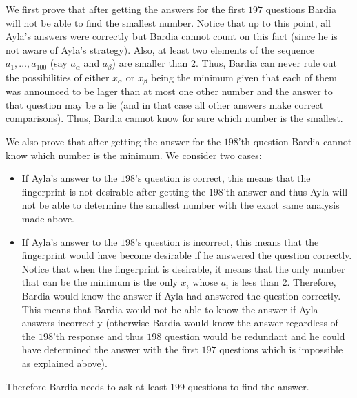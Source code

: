 \begin{solution}
We first prove that after getting the answers for the first $197$ questions Bardia will not be able to find the smallest number. Notice that up to this point, all Ayla's answers were correctly but Bardia cannot count on this fact (since he is not aware of Ayla's strategy). Also, at least two elements of the sequence $a_1, \ldots, a_{100}$ (say $a_{\alpha}$ and $a_{\beta}$) are smaller than $2$. Thus, Bardia can never rule out the possibilities of either $x_{\alpha}$ or $x_{\beta}$ being the minimum given that each of them was announced to be lager than at most one other number and the answer to that question may be a lie (and in that case all other answers make correct comparisons). Thus, Bardia cannot know for sure which number is the smallest.

We also prove that after getting the answer for the $198$'th question Bardia cannot know which number is the minimum. We consider two cases: 
\begin{itemize}
	\item If Ayla's answer to the $198$'s question is correct, this means that the fingerprint is not desirable after getting the $198$'th answer and thus Ayla will not be able to determine the smallest number with the exact same analysis made above.
	\item If Ayla's answer to the $198$'s question is incorrect, this means that the fingerprint would have become desirable if he answered the question correctly. Notice that when the fingerprint is desirable, it means that the only number that can be the minimum is the only $x_i$ whose $a_i$ is less than 2. Therefore, Bardia would know the answer if Ayla had answered the question correctly. This means that Bardia would not be able to know the answer if Ayla answers incorrectly (otherwise Bardia would know the answer regardless of the $198$'th response and thus $198$ question would be redundant and he could have determined the answer with the first $197$ questions which is impossible as explained above).
\end{itemize}

Therefore Bardia needs to ask at least $199$ questions to find the answer.
\end{solution}

